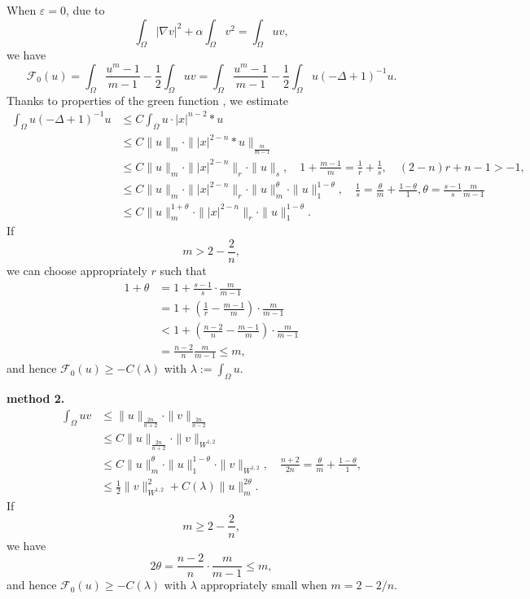 \documentclass[en,hazy,screen,blue,14pt]{elegantnote}
\numberwithin{dummy}{section}
\begin{document}
When $\varepsilon = 0$, due to
\[
	\int_\Omega |\nabla v|^2 + \alpha\int_\Omega v^2 = \int_\Omega uv,
\]
we have
\begin{equation}
	\mathcal{F}_0(u) = \int_\Omega \frac{u^m-1}{m-1} - \frac{1}{2}\int_\Omega uv 
		= \int_\Omega\frac{u^m-1}{m-1} - \frac{1}{2}\int_\Omega u(-\Delta + 1)^{-1}u.
\end{equation}
Thanks to properties of the green function \cite{Grueter1982},
we estimate
\begin{align*}
	\int_\Omega u(-\Delta+1)^{-1}u 
		&\leq C\int_\Omega u\cdot |x|^{n-2}*u\\
		&\leq C\|u\|_m\cdot \||x|^{2-n}*u\|_{\frac{m}{m-1}}\\
		&\leq C\|u\|_m \cdot \||x|^{2-n}\|_r\cdot\|u\|_s,\quad 1+\frac{m-1}{m} = \frac{1}{r} + \frac{1}{s},
			\quad (2-n)r + n-1 > -1,\\
		&\leq C\|u\|_m\cdot \||x|^{2-n}\|_r\cdot\|u\|_m^{\theta}\cdot\|u\|_1^{1-\theta},
			\quad \frac{1}{s} = \frac{\theta}{m} + \frac{1-\theta}{1}, \theta = \frac{s-1}{s}\frac{m}{m-1}\\
		&\leq C\|u\|_m^{1+\theta}\cdot \||x|^{2-n}\|_r\cdot\|u\|_1^{1-\theta}.
\end{align*}
If 
\[
	m > 2-\frac2n,
\]
we can choose appropriately $r$ such that 
\begin{align*}
	1+\theta 
		&= 1+\frac{s-1}{s}\cdot\frac{m}{m-1}\\
		&= 1 + \left(\frac1r-\frac{m-1}{m}\right)\cdot\frac{m}{m-1}\\
		&< 1 + \left(\frac{n-2}{n} - \frac{m-1}{m}\right)\cdot\frac{m}{m-1}\\
		&= \frac{n-2}{n}\frac{m}{m-1}\leq m,
\end{align*} 
and hence $\mathcal{F}_0(u) \geq - C(\lambda)$ with $\lambda := \int_\Omega u$.

\textbf{method 2.}
\begin{align*}
	\int_\Omega uv &\leq \|u\|_{\frac{2n}{n+2}}\cdot\|v\|_{\frac{2n}{n-2}}\\
		&\leq C\|u\|_{\frac{2n}{n+2}}\cdot\|v\|_{W^{1,2}}\\
		&\leq C\|u\|_m^\theta\cdot\|u\|_1^{1-\theta}\cdot\|v\|_{W^{1,2}},
			\quad \frac{n+2}{2n} = \frac{\theta}{m} + \frac{1-\theta}{1},\\
		&\leq \frac{1}{2}\|v\|_{W^{1,2}}^2 + C(\lambda)\|u\|_m^{2\theta}.
\end{align*}
If 
	\[
		m\geq 2-\frac2n,
	\]
we have 
\[
	2\theta = \frac{n-2}{n}\cdot\frac{m}{m-1}\leq m,
\]
and hence $\mathcal{F}_0(u) \geq - C(\lambda)$ with $\lambda$ appropriately small 
when $m=2-2/n$. 
\end{document}

